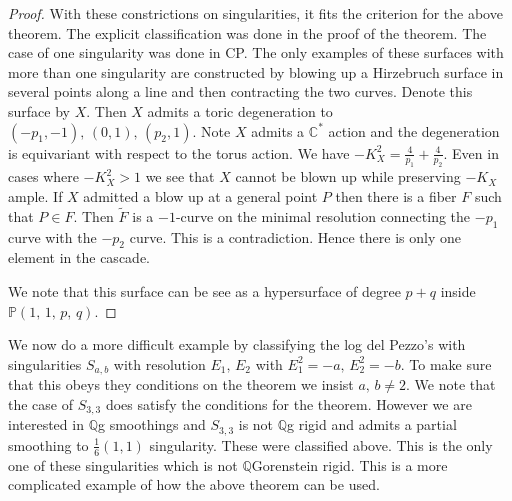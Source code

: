 \documentclass[11pt]{amsbook}
\theoremstyle{definition}
\theoremstyle{definition}
\theoremstyle{definition}
\theoremstyle{definition}
\theoremstyle{definition}
\theoremstyle{definition}
\theoremstyle{definition}
\theoremstyle{definition}
\newcommand{\ldp}{log del Pezzo}
\newcommand{\mb}[1]{\mathbb{#1}}
\begin{document}
\begin{proof}
With these constrictions on singularities, it fits the criterion for the above theorem. The explicit classification was done in the proof of the theorem. The case of one singularity was done in CP. The only examples of these surfaces with more than one singularity are constructed by blowing up a Hirzebruch surface in several points along a line and then contracting the two curves. Denote this surface by $X$. Then $X$ admits a toric degeneration to $(-p_1, -1), \, (0, 1), \, (p_2, 1)$. Note $X$ admits a $\mb{C}^*$ action and the degeneration is equivariant with respect to the torus action. We have $-K_X^2 = \frac{4}{p_1} + \frac{4}{p_2}$. Even in cases where $-K_X^2 > 1$ we see that $X$ cannot be blown up while preserving $-K_X$ ample. If $X$ admitted a blow up at a general point $P$ then there is a fiber $F$ such that $P \in F$. Then $\widetilde F$ is a $-1$-curve on the minimal resolution connecting the $-p_1$ curve with the $-p_2$ curve. This is a contradiction. Hence there is only one element in the cascade.



We note that this surface can be see as a hypersurface of degree $p+q$ inside $\mb{P}(1,\,1,\,p,\,q)$.

\end{proof}
We now do a more difficult example by classifying the \ldp's with singularities $S_{a,b}$ with resolution $E_1, \, E_2$ with $E_1^2 = -a,\, E_2^2 = -b$. To make sure that this obeys they conditions on the theorem we insist $a, \, b \neq 2$. We note that the case of $S_{3,3}$ does satisfy the conditions for the theorem. However we are interested in $\mb{Q}$g smoothings and $S_{3,3}$ is not $\mb{Q}$g rigid and admits a partial smoothing to $\frac{1}{6}(1,1)$ singularity. These were classified above. This is the only one of these singularities which is not $\mb{Q}$Gorenstein rigid. This is a more complicated example of how the above theorem can be used.
\end{document}
